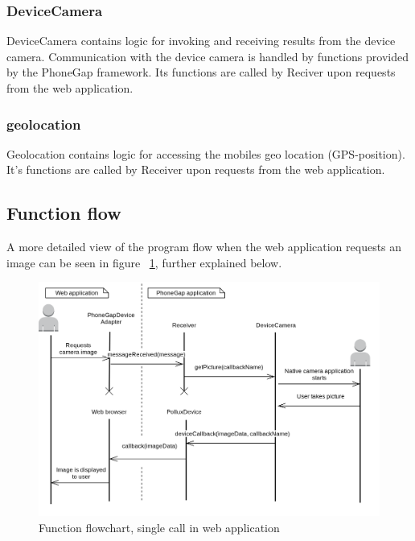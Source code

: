 \subsubsection{DeviceCamera}
DeviceCamera contains logic for invoking and receiving results from the device camera. Communication with the device camera is handled by functions provided by the PhoneGap framework. Its functions are called by Reciver upon requests from the web application.
\subsubsection{geolocation}
Geolocation contains logic for accessing the mobiles geo location (GPS-position). It's functions are called by Receiver upon requests from the web application.

\subsection{Function flow}\label{subsec:function-flow-phonegap}
A more detailed view of the program flow when the web application requests an image can be seen in figure ~\ref{fig:phonegapflow}, further explained below.
\begin{figure}[h!]
	\centering
    \includegraphics[width=120mm,natwidth=800,natheight=600]{./img/phonegapfunctionflow.png}
    \caption{Function flowchart, single call in web application} \label{fig:phonegapflow}
\end{figure}
